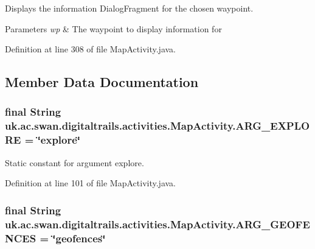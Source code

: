 Displays the information Dialog\+Fragment for the chosen waypoint. 


\begin{DoxyParams}{Parameters}
{\em wp} & The waypoint to display information for \\
\hline
\end{DoxyParams}


Definition at line 308 of file Map\+Activity.\+java.



\subsection{Member Data Documentation}
\hypertarget{classuk_1_1ac_1_1swan_1_1digitaltrails_1_1activities_1_1_map_activity_ac86be09c3bd3d33b4c0a99843e6ffecb}{
\subsubsection[{A\+R\+G\+\_\+\+E\+X\+P\+L\+O\+R\+E}]{\setlength{\rightskip}{0pt plus 5cm}final String uk.\+ac.\+swan.\+digitaltrails.\+activities.\+Map\+Activity.\+A\+R\+G\+\_\+\+E\+X\+P\+L\+O\+R\+E = \char`\"{}explore\char`\"{}\hspace{0.3cm}{\ttfamily [static]}}}\label{classuk_1_1ac_1_1swan_1_1digitaltrails_1_1activities_1_1_map_activity_ac86be09c3bd3d33b4c0a99843e6ffecb}


Static constant for argument explore. 



Definition at line 101 of file Map\+Activity.\+java.

\hypertarget{classuk_1_1ac_1_1swan_1_1digitaltrails_1_1activities_1_1_map_activity_af83f73ddb139f99dbdf40d4849b13bf9}{
\subsubsection[{A\+R\+G\+\_\+\+G\+E\+O\+F\+E\+N\+C\+E\+S}]{\setlength{\rightskip}{0pt plus 5cm}final String uk.\+ac.\+swan.\+digitaltrails.\+activities.\+Map\+Activity.\+A\+R\+G\+\_\+\+G\+E\+O\+F\+E\+N\+C\+E\+S = \char`\"{}geofences\char`\"{}\hspace{0.3cm}{\ttfamily [static]}}}\label{classuk_1_1ac_1_1swan_1_1digitaltrails_1_1activities_1_1_map_activity_af83f73ddb139f99dbdf40d4849b13bf9}


